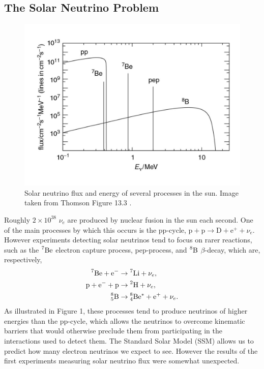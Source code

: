 \subsection{The Solar Neutrino Problem}

\begin{figure}
  \centering
  \includegraphics[height=0.33\textheight,keepaspectratio]
                {pictures/t13_3.pdf}
  \caption{Solar neutrino flux and energy of several processes in the sun.
           Image taken from Thomson Figure 13.3 \cite{thomson_modern_2013}.}
\end{figure}
Roughly $2\times10^{38}$ $\nu_e$ are produced by nuclear fusion in the sun
each second. One of the main processes by which this occurs is the pp-cycle,
$\text{p}+\text{p}\to\text{D}+\text{e}^++\nu_e$. However experiments detecting
solar neutrinos tend to focus on rarer reactions, such as the
$\prescript{7}{}{\text{Be}}$ electron capture process, pep-process, and
$\prescript{8}{}{\text{B}}$ $\beta$-decay, which are, respectively,
\begin{equation}
  \begin{aligned}
    \prescript{7}{}{\text{Be}}+\text{e}^-&\to\prescript{7}{}{\text{Li}}+\nu_e,
    \\
    \text{p}+\text{e}^-+\text{p}&\to\prescript{2}{}{\text{H}}+\nu_e, 
    \\
    \prescript{8}{5}{\text{B}}&\to\prescript{8}{4}{\text{Be}}^*+\text{e}^+
      +\nu_e.
  \end{aligned}
\end{equation}
As illustrated in Figure 1, these processes tend to produce neutrinos of higher
energies than the pp-cycle, which allows the neutrinos to overcome kinematic
barriers that would otherwise preclude them from participating in the
interactions used to detect them.
The Standard Solar Model (SSM) allows us to predict how many electron neutrinos
we expect to see. However the results of the first experiments measuring solar
neutrino flux were somewhat unexpected.

